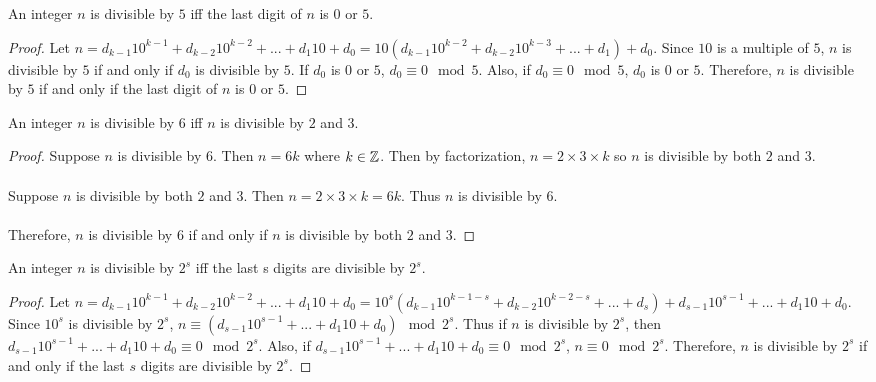 \begin{theorem}
An integer $n$ is divisible by $5$ iff the last digit of $n$ is $0$ or $5$.
\end{theorem}

\begin{proof}
Let $n = d_{k-1}10^{k-1} + d_{k-2}10^{k-2} + ... + d_{1}10 + d_{0} = 10(d_{k-1}10^{k-2} + d_{k-2}10^{k-3} + ... + d_{1}) + d_{0}$. Since $10$ is a multiple of $5$, $n$ is divisible by $5$ if and only if $d_{0}$ is divisible by $5$. If $d_{0}$ is $0$ or $5$, $d_{0} \equiv 0 \mod5$. Also, if $d_{0} \equiv 0 \mod5$, $d_{0}$ is $0$ or $5$. Therefore, $n$ is divisible by $5$ if and only if the last digit of $n$ is $0$ or $5$.
\end{proof}

\begin{theorem}
An integer $n$ is divisible by $6$ iff $n$ is divisible by $2$ and $3$.
\end{theorem}

\begin{proof}
Suppose $n$ is divisible by $6$. Then $n = 6k$ where $k \in \mathbb{Z}$. Then by factorization, $n = 2 \times 3 \times k$ so $n$ is divisible by both $2$ and $3$. \\
\\
Suppose $n$ is divisible by both $2$ and $3$. Then $n = 2 \times 3 \times k = 6k$. Thus $n$ is divisible by $6$. \\
\\
Therefore, $n$ is divisible by $6$ if and only if $n$ is divisible by both $2$ and $3$.
\end{proof}

\begin{theorem}
An integer $n$ is divisible by $2^s$ iff the last s digits are divisible by $2^s$.
\end{theorem}

\begin{proof}
Let $n = d_{k-1}10^{k-1} + d_{k-2}10^{k-2} + ... + d_{1}10 + d_{0} = 10^s(d_{k-1}10^{k-1-s} + d_{k-2}10^{k-2-s} + ... + d_{s}) + d_{s-1}10^{s-1} + ... + d_{1}10 + d_{0}$. Since $10^s$ is divisible by $2^s$, $n \equiv (d_{s-1}10^{s-1} + ... + d_{1}10 + d_{0}) \mod 2^s$. Thus if $n$ is divisible by $2^s$, then $d_{s-1}10^{s-1} + ... + d_{1}10 + d_{0} \equiv 0 \mod 2^s$. Also, if $d_{s-1}10^{s-1} + ... + d_{1}10 + d_{0} \equiv 0 \mod 2^s$, $n \equiv 0 \mod 2^s$. Therefore, $n$ is divisible by $2^s$ if and only if the last $s$ digits are divisible by $2^s$. 
\end{proof}

